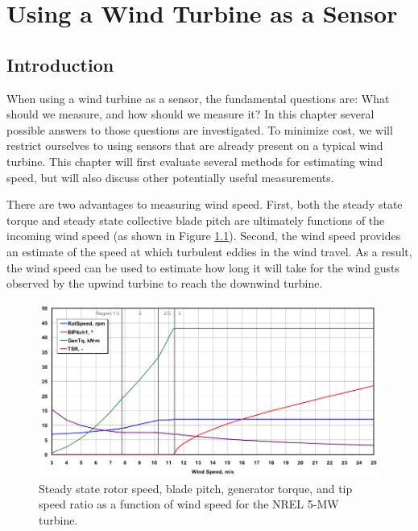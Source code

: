 
\chapter{Using a Wind Turbine as a Sensor} %

\label{Chapter2} %




\section{Introduction}

When using a wind turbine as a sensor, the fundamental questions are: What should we measure, and how should we measure it? In this chapter several possible answers to those questions are investigated. To minimize cost, we will restrict ourselves to using sensors that are already present on a typical wind turbine. This chapter will first evaluate several methods for estimating wind speed, but will also discuss other potentially useful measurements.

There are two advantages to measuring wind speed.  First, both the steady state torque and steady state collective blade pitch are ultimately functions of the incoming wind speed (as shown in Figure \ref{fig2-1}).  Second, the wind speed provides an estimate of the speed at which turbulent eddies in the wind travel. As a result, the wind speed can be used to estimate how long it will take for the wind gusts observed by the upwind turbine to reach the downwind turbine. 


\begin{figure}[htbp]
	\centering
		\includegraphics[width=\linewidth]{Figures/ch2Figures/fig2-1.png}
		
	\caption{Steady state rotor speed, blade pitch, generator torque, and tip speed ratio as a function of wind speed for the NREL 5-MW turbine.\cite{jonkman2009}}
	\label{fig2-1}
\end{figure}

